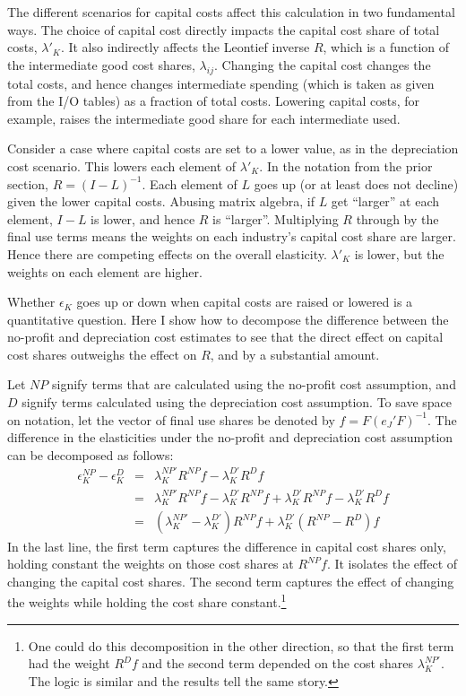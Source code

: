 \documentclass[11pt]{article}
\begin{document}
The different scenarios for capital costs affect this calculation in two fundamental ways. The choice of capital cost directly impacts the capital cost share of total costs, $\lambda'_K$. It also indirectly affects the Leontief inverse $R$, which is a function of the intermediate good cost shares, $\lambda_{ij}$. Changing the capital cost changes the total costs, and hence changes intermediate spending (which is taken as given from the I/O tables) as a fraction of total costs. Lowering capital costs, for example, raises the intermediate good share for each intermediate used. 

Consider a case where capital costs are set to a lower value, as in the depreciation cost scenario. This lowers each element of $\lambda'_K$. In the notation from the prior section, $R = (I - L)^{-1}$. Each element of $L$ goes up (or at least does not decline) given the lower capital costs. Abusing matrix algebra, if $L$ get ``larger'' at each element, $I-L$ is lower, and hence $R$ is ``larger''. Multiplying $R$ through by the final use terms means the weights on each industry's capital cost share are larger. Hence there are competing effects on the overall elasticity. $\lambda'_K$ is lower, but the weights on each element are higher. 

Whether $\epsilon_K$ goes up or down when capital costs are raised or lowered is a quantitative question. Here I show how to decompose the difference between the no-profit and depreciation cost estimates to see that the direct effect on capital cost shares outweighs the effect on $R$, and by a substantial amount. 

Let $NP$ signify terms that are calculated using the no-profit cost assumption, and $D$ signify terms calculated using the depreciation cost assumption. To save space on notation, let the vector of final use shares be denoted by $f = F \left(e_J'F\right)^{-1}$. The difference in the elasticities under the no-profit and depreciation cost assumption can be decomposed as follows:
\begin{eqnarray*}
	\epsilon_K^{NP} - \epsilon_K^D &=& \lambda_K^{NP'} R^{NP} f -  \lambda_K^{D'} R^{D} f \\
	                &=& \lambda_K^{NP'} R^{NP} f -  \lambda_K^{D'} R^{NP} f + \lambda_K^{D'} R^{NP} f -\lambda_K^{D'} R^{D} f \\
	                &=& \left(\lambda_K^{NP'} - \lambda_K^{D'} \right) R^{NP} f + \lambda_K^{D'} \left(R^{NP} - R^D \right) f 
\end{eqnarray*}
In the last line, the first term captures the difference in capital cost shares only, holding constant the weights on those cost shares at $R^{NP}f$. It isolates the effect of changing the capital cost shares. The second term captures the effect of changing the weights while holding the cost share constant.\footnote{One could do this decomposition in the other direction, so that the first term had the weight $R^{D}f$ and the second term depended on the cost shares $\lambda_K^{NP'}$. The logic is similar and the results tell the same story.}
\end{document}
